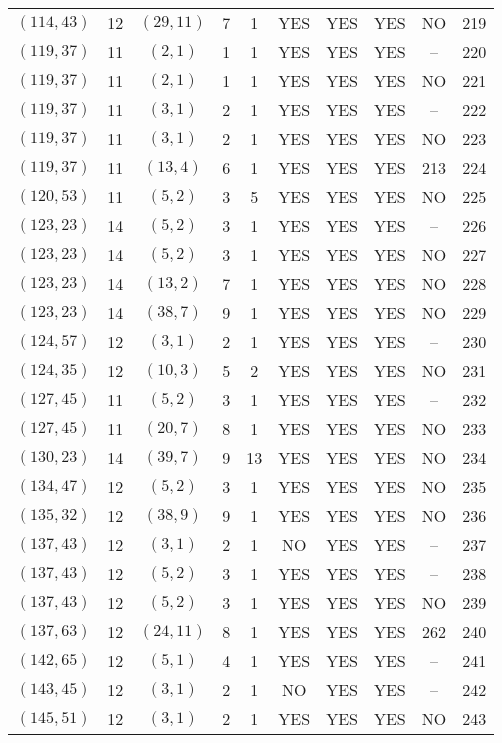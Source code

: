 \begin{longtable}{|c|c|c|c|c|c|c|c|c|c|}
$(114, 43)$ & 12 & $(29, 11)$ & 7 & 1 & YES & YES & YES & NO & 219\\
$(119, 37)$ & 11 & $(2, 1)$ & 1 & 1 & YES & YES & YES & -- & 220\\
$(119, 37)$ & 11 & $(2, 1)$ & 1 & 1 & YES & YES & YES & NO & 221\\
$(119, 37)$ & 11 & $(3, 1)$ & 2 & 1 & YES & YES & YES & -- & 222\\
$(119, 37)$ & 11 & $(3, 1)$ & 2 & 1 & YES & YES & YES & NO & 223\\
$(119, 37)$ & 11 & $(13, 4)$ & 6 & 1 & YES & YES & YES & 213 & 224\\
$(120, 53)$ & 11 & $(5, 2)$ & 3 & 5 & YES & YES & YES & NO & 225\\
$(123, 23)$ & 14 & $(5, 2)$ & 3 & 1 & YES & YES & YES & -- & 226\\
$(123, 23)$ & 14 & $(5, 2)$ & 3 & 1 & YES & YES & YES & NO & 227\\
$(123, 23)$ & 14 & $(13, 2)$ & 7 & 1 & YES & YES & YES & NO & 228\\
$(123, 23)$ & 14 & $(38, 7)$ & 9 & 1 & YES & YES & YES & NO & 229\\
$(124, 57)$ & 12 & $(3, 1)$ & 2 & 1 & YES & YES & YES & -- & 230\\
$(124, 35)$ & 12 & $(10, 3)$ & 5 & 2 & YES & YES & YES & NO & 231\\
$(127, 45)$ & 11 & $(5, 2)$ & 3 & 1 & YES & YES & YES & -- & 232\\
$(127, 45)$ & 11 & $(20, 7)$ & 8 & 1 & YES & YES & YES & NO & 233\\
$(130, 23)$ & 14 & $(39, 7)$ & 9 & 13 & YES & YES & YES & NO & 234\\
$(134, 47)$ & 12 & $(5, 2)$ & 3 & 1 & YES & YES & YES & NO & 235\\
$(135, 32)$ & 12 & $(38, 9)$ & 9 & 1 & YES & YES & YES & NO & 236\\
$(137, 43)$ & 12 & $(3, 1)$ & 2 & 1 & NO & YES & YES & -- & 237\\
$(137, 43)$ & 12 & $(5, 2)$ & 3 & 1 & YES & YES & YES & -- & 238\\
$(137, 43)$ & 12 & $(5, 2)$ & 3 & 1 & YES & YES & YES & NO & 239\\
$(137, 63)$ & 12 & $(24, 11)$ & 8 & 1 & YES & YES & YES & 262 & 240\\
$(142, 65)$ & 12 & $(5, 1)$ & 4 & 1 & YES & YES & YES & -- & 241\\
$(143, 45)$ & 12 & $(3, 1)$ & 2 & 1 & NO & YES & YES & -- & 242\\
$(145, 51)$ & 12 & $(3, 1)$ & 2 & 1 & YES & YES & YES & NO & 243\\

\end{longtable}
